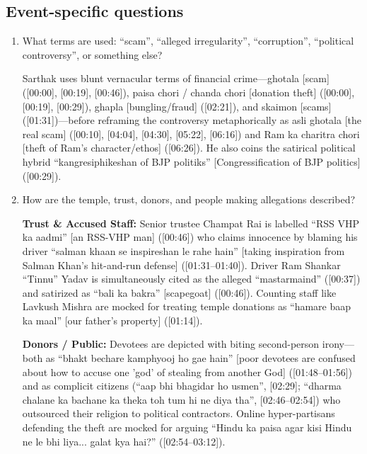 \documentclass[10pt,a4paper]{article}
\begin{document}
\subsection*{Event-specific questions}
\begin{enumerate}[leftmargin=1.5em, itemsep=6pt, topsep=4pt]
  \item What terms are used: ``scam'', ``alleged irregularity'', ``corruption'', ``political controversy'', or something else?\par\smallskip
  Sarthak uses blunt vernacular terms of financial crime---ghotala [scam] ([00:00], [00:19], [00:46]), paisa chori / chanda chori [donation theft] ([00:00], [00:19], [00:29]), ghapla [bungling/fraud] ([02:21]), and skaimon [scams] ([01:31])---before reframing the controversy metaphorically as asli ghotala [the real scam] ([00:10], [04:04], [04:30], [05:22], [06:16]) and Ram ka charitra chori [theft of Ram's character/ethos] ([06:26]). He also coins the satirical political hybrid ``kangresiphikeshan of BJP politiks'' [Congressification of BJP politics] ([00:29]).
  \item How are the temple, trust, donors, and people making allegations described?\par\smallskip
  \textbf{Trust \& Accused Staff:} Senior trustee Champat Rai is labelled ``RSS VHP ka aadmi'' [an RSS-VHP man] ([00:46]) who claims innocence by blaming his driver ``salman khaan se inspireshan le rahe hain'' [taking inspiration from Salman Khan's hit-and-run defense] ([01:31--01:40]). Driver Ram Shankar ``Tinnu'' Yadav is simultaneously cited as the alleged ``mastarmaind'' ([00:37]) and satirized as ``bali ka bakra'' [scapegoat] ([00:46]). Counting staff like Lavkush Mishra are mocked for treating temple donations as ``hamare baap ka maal'' [our father's property] ([01:14]).

  \textbf{Donors / Public:} Devotees are depicted with biting second-person irony---both as ``bhakt bechare kamphyooj ho gae hain'' [poor devotees are confused about how to accuse one 'god' of stealing from another God] ([01:48--01:56]) and as complicit citizens (``aap bhi bhagidar ho usmen'', [02:29]; ``dharma chalane ka bachane ka theka toh tum hi ne diya tha'', [02:46--02:54]) who outsourced their religion to political contractors. Online hyper-partisans defending the theft are mocked for arguing ``Hindu ka paisa agar kisi Hindu ne le bhi liya... galat kya hai?'' ([02:54--03:12]).


\end{enumerate}
\end{document}
